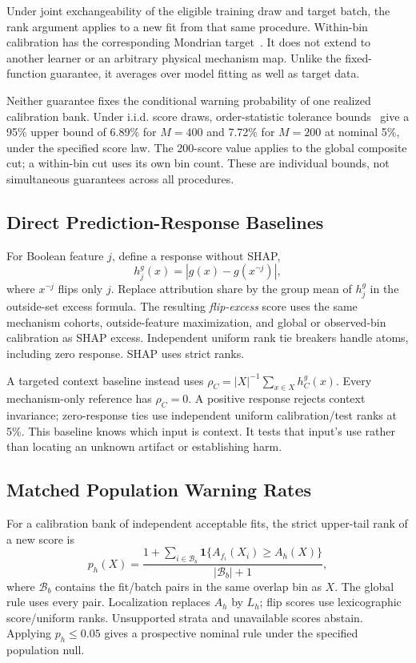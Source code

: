 \documentclass[conference]{IEEEtran}
\begin{document}
Under joint exchangeability of the eligible training draw and target batch, the rank argument applies to a new fit from that same procedure. Within-bin calibration has the corresponding Mondrian target~\cite{vovk2005algorithmic,vovk2012conditional}. It does not extend to another learner or an arbitrary physical mechanism map. Unlike the fixed-function guarantee, it averages over model fitting as well as target data.

Neither guarantee fixes the conditional warning probability of one realized calibration bank. Under i.i.d. score draws, order-statistic tolerance bounds~\cite{vovk2012conditional} give a 95\% upper bound of 6.89\% for $M=400$ and 7.72\% for $M=200$ at nominal 5\%, under the specified score law. The 200-score value applies to the global composite cut; a within-bin cut uses its own bin count. These are individual bounds, not simultaneous guarantees across all procedures.

\subsection{Direct Prediction-Response Baselines}
For Boolean feature $j$, define a response without SHAP,
\begin{equation}
 h_j^g(x)=|g(x)-g(x^{\lnot j})|,
\end{equation}
where $x^{\lnot j}$ flips only $j$. Replace attribution share by the group mean of $h_j^g$ in the outside-set excess formula. The resulting \emph{flip-excess} score uses the same mechanism cohorts, outside-feature maximization, and global or observed-bin calibration as SHAP excess. Independent uniform rank tie breakers handle atoms, including zero response. SHAP uses strict ranks.

A targeted context baseline instead uses $\rho_C=|X|^{-1}\sum_{x\in X}h_C^g(x)$. Every mechanism-only reference has $\rho_C=0$. A positive response rejects context invariance; zero-response ties use independent uniform calibration/test ranks at 5\%. This baseline knows which input is context. It tests that input's use rather than locating an unknown artifact or establishing harm.

\subsection{Matched Population Warning Rates}
For a calibration bank of independent acceptable fits, the strict upper-tail rank of a new score is
\begin{equation}
 p_h(X)=\frac{1+\sum_{i\in\mathcal B_b}\mathbf1\{A_{f_i}(X_i)\geq A_h(X)\}}{|\mathcal B_b|+1},
\end{equation}
where $\mathcal B_b$ contains the fit/batch pairs in the same overlap bin as $X$. The global rule uses every pair. Localization replaces $A_h$ by $L_h$; flip scores use lexicographic score/uniform ranks. Unsupported strata and unavailable scores abstain. Applying $p_h\leq0.05$ gives a prospective nominal rule under the specified population null.
\end{document}
